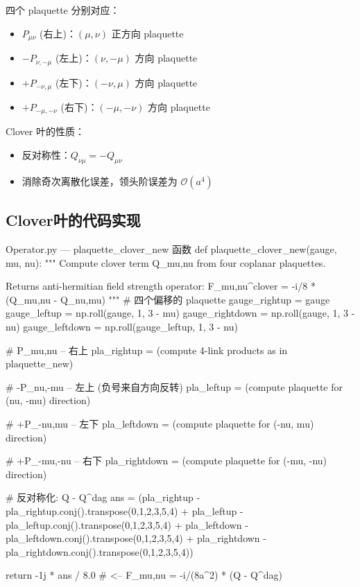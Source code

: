 \documentclass[12pt,a4paper]{ctexart}
\begin{document}
四个 plaquette 分别对应：
\begin{itemize}
    \item $P_{\mu\nu}$ (右上)：$(\mu, \nu)$ 正方向 plaquette
    \item $-P_{\nu,-\mu}$ (左上)：$(\nu, -\mu)$ 方向 plaquette
    \item $+P_{-\nu,\mu}$ (左下)：$(-\nu, \mu)$ 方向 plaquette
    \item $+P_{-\mu,-\nu}$ (右下)：$(-\mu, -\nu)$ 方向 plaquette
\end{itemize}

Clover 叶的性质\cite{场强张量}：
\begin{itemize}
    \item 反对称性：$Q_{\nu\mu} = -Q_{\mu\nu}$
    \item 消除奇次离散化误差，领头阶误差为 $\mathcal{O}(a^{4})$
\end{itemize}

\subsection{Clover叶的代码实现}

\begin{codeblock}{Operator.py --- plaquette\_clover\_new 函数}
def plaquette_clover_new(gauge, mu, nu):
    """
    Compute clover term Q_{mu,nu} from four coplanar plaquettes.

    Returns anti-hermitian field strength operator:
    F_{mu,nu}^{clover} = -i/8 * (Q_{mu,nu} - Q_{nu,mu})
    """
    # 四个偏移的 plaquette
    gauge_rightup = gauge
    gauge_leftup  = np.roll(gauge, 1, 3 - mu)
    gauge_rightdown = np.roll(gauge, 1, 3 - nu)
    gauge_leftdown  = np.roll(gauge_leftup, 1, 3 - nu)

    # P_{mu,nu}  -- 右上
    pla_rightup = (compute 4-link products as in plaquette_new)

    # -P_{nu,-mu}  -- 左上 (负号来自方向反转)
    pla_leftup = (compute plaquette for (nu, -mu) direction)

    # +P_{-nu,mu}  -- 左下
    pla_leftdown = (compute plaquette for (-nu, mu) direction)

    # +P_{-mu,-nu}  -- 右下
    pla_rightdown = (compute plaquette for (-mu, -nu) direction)

    # 反对称化: Q - Q^dag
    ans = (pla_rightup  - pla_rightup.conj().transpose(0,1,2,3,5,4)
         + pla_leftup   - pla_leftup.conj().transpose(0,1,2,3,5,4)
         + pla_leftdown - pla_leftdown.conj().transpose(0,1,2,3,5,4)
         + pla_rightdown - pla_rightdown.conj().transpose(0,1,2,3,5,4))

    return -1j * ans / 8.0  # <-- F_{mu,nu} = -i/(8a^2) * (Q - Q^dag)
\end{codeblock}
\end{document}
